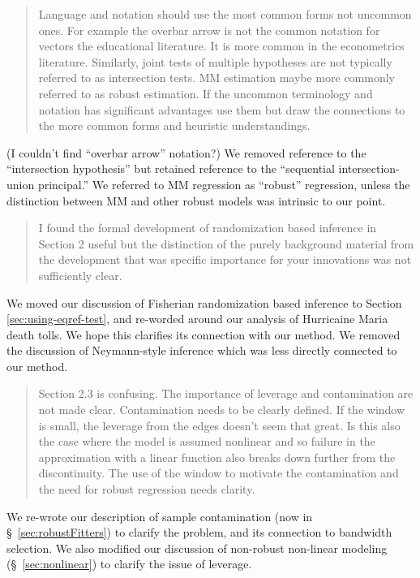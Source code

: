 \documentclass[12pt]{article}
\begin{document}
\begin{quote}
Language and notation should use the most common forms not
uncommon ones. For example the overbar arrow is not the common
notation for vectors the educational literature. It is more common in
the econometrics literature. Similarly, joint tests of multiple
hypotheses are not typically referred to as intersection tests. MM
estimation maybe more commonly referred to as robust estimation. If
the uncommon terminology and notation has significant advantages use
them but draw the connections to the more common forms and heuristic
understandings.
\end{quote}
(I couldn't find ``overbar arrow'' notation?) We removed reference to
the ``intersection hypothesis'' but retained reference to the
``sequential intersection-union principal.'' We referred to MM
regression as ``robust'' regression, unless the distinction between MM
and other robust models was intrinsic to our point.

\begin{quote}
I found the formal development of randomization based inference in
Section 2 useful but the distinction of the purely background material
from the development that was specific importance for your innovations
was not sufficiently clear.
\end{quote}
We moved our discussion of Fisherian randomization based inference to
Section \ref{sec:using-eqref-test}, and re-worded around our
analysis of Hurricaine Maria death tolls. We hope this clarifies its
connection with our method. We removed the discussion of Neymann-style
inference which was less directly connected to our method.

\begin{quote}
Section 2.3 is confusing. The importance of leverage and contamination
are not made clear. Contamination needs to be clearly defined. If the
window is small, the leverage from the edges doesn’t seem that
great. Is this also the case where the model is assumed nonlinear and
so failure in the approximation with a linear function also breaks
down further from the discontinuity. The use of the window to motivate
the contamination and the need for robust regression needs clarity.
\end{quote}
We re-wrote our description of sample contamination (now in
\S~\ref{sec:robustFitters}) to clarify the problem, and its connection
to bandwidth selection.
We also modified our discussion of non-robust non-linear modeling
(\S~\ref{sec:nonlinear}) to clarify the issue of leverage.
\end{document}

